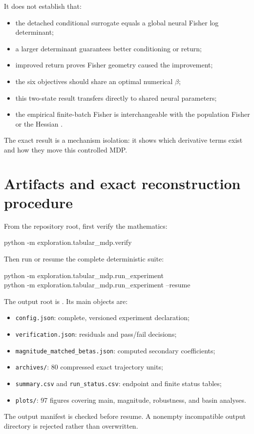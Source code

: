 \documentclass[10pt,a4paper]{article}
\begin{document}
It does not establish that:
\begin{itemize}
\item the detached conditional surrogate equals a global neural Fisher log
determinant;
\item a larger determinant guarantees better conditioning or return;
\item improved return proves Fisher geometry caused the improvement;
\item the six objectives should share an optimal numerical $\beta$;
\item this two-state result transfers directly to shared neural parameters;
\item the empirical finite-batch Fisher is interchangeable with the population
Fisher or the Hessian \cite{Kunstner2019}.
\end{itemize}

The exact result is a mechanism isolation: it shows which derivative terms
exist and how they move this controlled MDP.

\section{Artifacts and exact reconstruction procedure}

From the repository root, first verify the mathematics:
\begin{center}\footnotesize\ttfamily
python -m exploration.tabular\_mdp.verify
\end{center}
Then run or resume the complete deterministic suite:
\begin{center}\footnotesize\ttfamily
python -m exploration.tabular\_mdp.run\_experiment\\
python -m exploration.tabular\_mdp.run\_experiment --resume
\end{center}

The output root is
.  Its main objects are:
\begin{itemize}
\item \texttt{config.json}: complete, versioned experiment declaration;
\item \texttt{verification.json}: residuals and pass/fail decisions;
\item \texttt{magnitude\_matched\_betas.json}: computed secondary coefficients;
\item \texttt{archives/}: 80 compressed exact trajectory units;
\item \texttt{summary.csv} and \texttt{run\_status.csv}: endpoint and finite
status tables;
\item \texttt{plots/}: 97 figures covering main, magnitude, robustness, and
basin analyses.
\end{itemize}
The output manifest is checked before resume.  A nonempty incompatible output
directory is rejected rather than overwritten.
\end{document}

